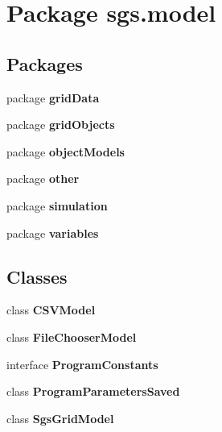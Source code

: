 \section{Package sgs.\-model}
\label{namespacesgs_1_1model}
\subsection*{Packages}
\begin{DoxyCompactItemize}
\item 
package {\bf grid\-Data}
\item 
package {\bf grid\-Objects}
\item 
package {\bf object\-Models}
\item 
package {\bf other}
\item 
package {\bf simulation}
\item 
package {\bf variables}
\end{DoxyCompactItemize}
\subsection*{Classes}
\begin{DoxyCompactItemize}
\item 
class {\bf C\-S\-V\-Model}
\item 
class {\bf File\-Chooser\-Model}
\item 
interface {\bf Program\-Constants}
\item 
class {\bf Program\-Parameters\-Saved}
\item 
class {\bf Sgs\-Grid\-Model}
\end{DoxyCompactItemize}
